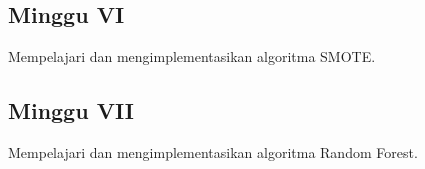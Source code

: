 \subsection{Minggu VI}
Mempelajari dan mengimplementasikan algoritma SMOTE.

\subsection{Minggu VII}
Mempelajari dan mengimplementasikan algoritma Random Forest.


\newpage
{}
\advisorsignature

\newpage
\appendix




\clearpage
{}
\printbibliography


